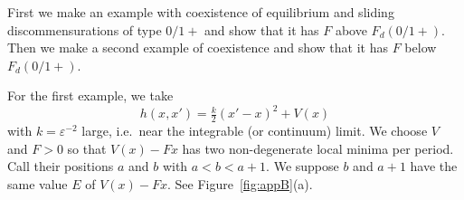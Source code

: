 \documentclass[12pt]{article}
\newcommand{\eps}{\varepsilon}
\newcommand{\RSM}{\textcolor{red}}
\begin{document}

First we make an example with coexistence of equilibrium and sliding discommensurations of type $0/1+$ and show that it has $F$ above $F_d(0/1+)$.  Then we make a second example of coexistence and show that it has $F$ below $F_d(0/1+)$.


For the first example, we take
\begin{equation}
h(x,x') = \tfrac{k}{2} (x'-x)^2 + V(x)
\label{eq:hkV}
\end{equation}
with $k=\eps^{-2}$ large, i.e.~near the integrable (or continuum) limit.  We choose $V$ and $F>0$ so that $V(x)-Fx$ has two non-degenerate local minima per period.  Call their positions $a$ and $b$ with $a<b<a+1$.  We suppose $b$ and $a+1$ have the same value $E$ of $V(x)-Fx$.  See Figure~\ref{fig:appB}(a).
\end{document}
